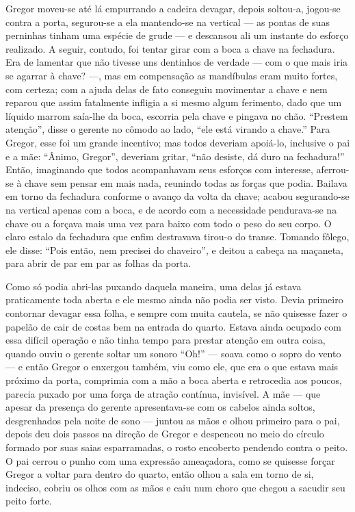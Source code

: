 Gregor moveu-se até lá empurrando a cadeira devagar, depois soltou-a,
jogou-se contra a porta, segurou-se a ela mantendo-se na vertical --- as
pontas de suas perninhas tinham uma espécie de grude --- e descansou ali um
instante do esforço realizado. A seguir, contudo, foi tentar girar com a
boca a chave na fechadura. Era de lamentar que não tivesse uns dentinhos
de verdade --- com o que mais iria se agarrar à chave? ---, mas em compensação
as mandíbulas eram muito fortes, com certeza; com a ajuda delas de fato
conseguiu movimentar a chave e nem reparou que assim fatalmente infligia a
si mesmo algum ferimento, dado que um líquido marrom saía-lhe da boca,
escorria pela chave e pingava no chão. “Prestem atenção”, disse o gerente
no cômodo ao lado, “ele está virando a chave.” Para Gregor, esse foi um
grande incentivo; mas todos deveriam apoiá-lo, inclusive o pai e a mãe:
“Ânimo, Gregor”, deveriam gritar, “não desiste, dá duro na fechadura!”
Então, imaginando que todos acompanhavam seus esforços com interesse,
aferrou-se à chave sem pensar em mais nada, reunindo todas as forças que
podia. Bailava em torno da fechadura conforme o avanço da volta da chave;
acabou segurando-se na vertical apenas com a boca, e de acordo com a
necessidade pendurava-se na chave ou a forçava mais uma vez para baixo com
todo o peso do seu corpo. O claro estalo da fechadura que enfim destravava
tirou-o do transe. Tomando fôlego, ele disse: “Pois então, nem precisei do
chaveiro”, e deitou a cabeça na maçaneta, para abrir de par em par as
folhas da porta.

Como só podia abri-las puxando daquela maneira, uma delas já estava
praticamente toda aberta e ele mesmo ainda não podia ser visto. Devia
primeiro contornar devagar essa folha, e sempre com muita cautela, se não
quisesse fazer o papelão de cair de costas bem na entrada do quarto.
Estava ainda ocupado com essa difícil operação e não tinha tempo para
prestar atenção em outra coisa, quando ouviu o gerente soltar um sonoro
“Oh!” --- soava como o sopro do vento --- e então Gregor o enxergou também,
viu como ele, que era o que estava mais próximo da porta, comprimia com a
mão a boca aberta e retrocedia aos poucos, parecia puxado por uma força de
atração contínua, invisível. A mãe --- que apesar da presença do gerente
apresentava-se com os cabelos ainda soltos, desgrenhados pela noite de
sono --- juntou as mãos e olhou primeiro para o pai, depois deu dois passos
na direção de Gregor e despencou no meio do círculo formado por suas saias
esparramadas, o rosto encoberto pendendo contra o peito. O pai cerrou o
punho com uma expressão ameaçadora, como se quisesse forçar Gregor a
voltar para dentro do quarto, então olhou a sala em torno de si, indeciso,
cobriu os olhos com as mãos e caiu num choro que chegou a sacudir seu
peito forte.

